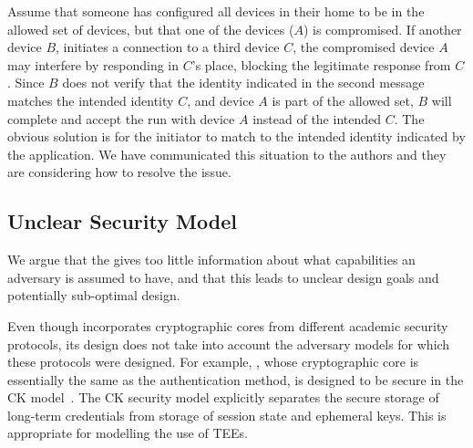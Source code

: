 \documentclass[runningheads, envcountsame, hidelinks, a4paper, draft, x11names]{llncs}
\begin{document}
Assume that someone has configured all devices in their home to be in the
allowed set of devices, but that one of the devices ($A$) is compromised.
%
If another device $B$, initiates a connection to a third device $C$, the
compromised device $A$ may interfere by responding in $C$'s place, blocking
the legitimate response from $C$.
%
Since $B$ does not verify that the identity indicated in the second message
matches the intended identity $C$, and device $A$ is part of the allowed set,
$B$ will complete and accept the \mEdhoc{} run with device $A$ instead of the
intended $C$.
%
The obvious solution is for the initiator to match \mIdcredr{} to the intended
identity indicated by the application.
%
We have communicated this situation to the \mEdhoc{} authors and they are considering
how to resolve the issue.
%

\subsection{Unclear Security Model}
%
We argue that the \mSpec{} gives too little information about what capabilities
an adversary is assumed to have, and that this leads to unclear design goals and
potentially sub-optimal design.
%
%

%
Even though \mEdhoc{} incorporates cryptographic cores from different academic
security protocols, its design does not take into account the adversary models
for which these protocols were designed.
%
For example, \mOptls{}, whose cryptographic core is essentially the same
as the \mStat{} authentication method, is designed to be secure in the CK
model~\cite{DBLP:conf/crypto/CanettiK02}.
%
The CK security model explicitly separates the secure storage of long-term
credentials from storage of session state and ephemeral keys.
%
This is appropriate for modelling the use of TEEs.
%
\end{document}
